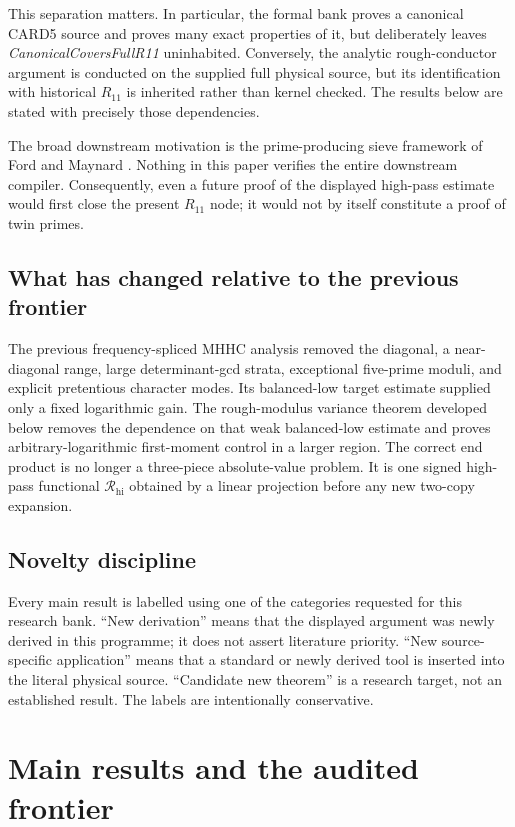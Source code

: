 \documentclass[11pt,reqno]{amsart}
\numberwithin{equation}{section}
\theoremstyle{definition}
\theoremstyle{remark}
\newcommand{\1}{\mathbf 1}
\newcommand{\RR}{\mathcal R}
\newcommand{\Rhi}{\RR_{\mathrm{hi}}}
\begin{document}
This separation matters.  In particular, the formal bank proves a canonical
CARD5 source and proves many exact properties of it, but deliberately leaves
\emph{CanonicalCoversFullR11} uninhabited.  Conversely, the analytic
rough-conductor argument is conducted on the supplied full physical source,
but its identification with historical $R_{11}$ is inherited rather than
kernel checked.  The results below are stated with precisely those dependencies.

The broad downstream motivation is the prime-producing sieve framework of Ford
and Maynard \cite{FordMaynard2024}.  Nothing in this paper verifies the entire
downstream compiler.  Consequently, even a future proof of the displayed
high-pass estimate would first close the present $R_{11}$ node; it would not by
itself constitute a proof of twin primes.

\subsection{What has changed relative to the previous frontier}

The previous frequency-spliced MHHC analysis removed the diagonal, a
near-diagonal range, large determinant-gcd strata, exceptional five-prime
moduli, and explicit pretentious character modes.  Its balanced-low target
estimate supplied only a fixed logarithmic gain.  The rough-modulus variance
theorem developed below removes the dependence on that weak balanced-low
estimate and proves arbitrary-logarithmic first-moment control in a larger
region.  The correct end product is no longer a three-piece absolute-value
problem.  It is one signed high-pass functional $\Rhi$ obtained by a linear
projection before any new two-copy expansion.

\subsection{Novelty discipline}

Every main result is labelled using one of the categories requested for this
research bank.  ``New derivation'' means that the displayed argument was newly
derived in this programme; it does not assert literature priority.  ``New
source-specific application'' means that a standard or newly derived tool is
inserted into the literal physical source.  ``Candidate new theorem'' is a
research target, not an established result.  The labels are intentionally
conservative.

\section{Main results and the audited frontier}\label{sec:main}
\end{document}
